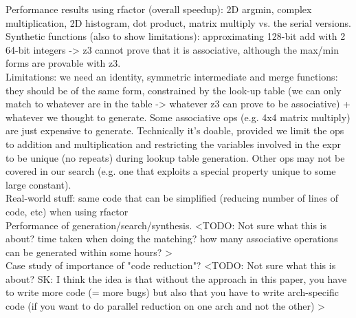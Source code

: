 Performance results using rfactor (overall speedup): 2D argmin, complex multiplication, 2D histogram, dot product, matrix multiply vs. the serial versions. \\

Synthetic functions (also to show limitations): approximating 128-bit add with 2 64-bit integers -> z3 cannot prove that it is associative, although the max/min forms are provable with z3. \\

Limitations: we need an identity, symmetric intermediate and merge functions: they should be of the same form, constrained by the look-up table (we can only match to whatever are in the table -> whatever z3 can prove to be associative) + whatever we thought to generate. Some associative ops (e.g. 4x4 matrix multiply) are just expensive to generate. Technically it's doable, provided we limit the ops to addition and multiplication and restricting the variables involved in the expr to be unique (no repeats) during lookup table generation. Other ops may not be covered in our search (e.g. one that exploits a special property unique to some large constant). \\

Real-world stuff: same code that can be simplified (reducing number of lines of code, etc) when using rfactor \\

Performance of generation/search/synthesis. <TODO: Not sure what this is about? time taken when doing the matching? how many associative operations can be generated within some hours? > \\

Case study of importance of "code reduction"? <TODO: Not sure what this is about? SK: I think the idea is that without the approach in this paper, you have to write more code (= more bugs) but also that you have to write arch-specific code (if you want to do parallel reduction on one arch and not the other) > \\ 
